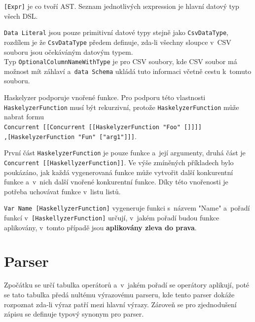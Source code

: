 \documentclass[male, czech]{kithesis}
\newcommand{\haskellInline}[1]{\colorbox{gray!10}{\texttt{#1}}}
\begin{document}
\haskellInline{[Expr]} je co tvoří AST.
Seznam jednotlivých \i{expression} je hlavní datový typ všech DSL. 

\haskellInline{Data Literal} jsou pouze primitivní datové typy stejně jako
\haskellInline{CsvDataType}, 
rozdílem je že \haskellInline{CsvDataType} předem definuje, 
zda-li všechny sloupce v~CSV souboru jsou očekáváným datovým typem. \\
Typ \haskellInline{OptionalColumnNameWithType} je pro CSV soubory, 
kde CSV soubor má možnost
mít záhlaví a~\haskellInline{data Schema} ukládá tuto informaci včetně cestu k~tomuto souboru. 

Haskelyzer podporuje vnořené funkce. 
Pro podporu této vlastnosti \haskellInline{HaskelyzerFunction} musí být rekurzivní, 
protože \haskellInline{HaskelyzerFunction} může nabrat formu 
\\
\haskellInline{Concurrent [[Concurrent [[HaskelyzerFunction "Foo" []]]]}
\\
\haskellInline{,[HaskelyzerFunction "Fun" ["arg1"]]]}.

První část \haskellInline{HaskelyzerFunction} je pouze funkce
a~její argumenty, 
druhá část je \\
\haskellInline{Concurrent [[HaskellyzerFunction]]}.
Ve výše zmíněných příkladech bylo poukázáno, 
jak každá vygenerovaná funkce může vytvořit 
další konkurentní funkce a~v~nich další vnořené konkurentní funkce. 
Díky této vnořenosti 
je potřeba uchovávat funkce v~listu listů.

\haskellInline{Var Name [HaskellyzerFunction]} vygeneruje funkci s~názvem "Name"
a~pořadí funkcí v~\haskellInline{[HaskellyzerFunction]} určují, 
v~jakém pořadí budou funkce aplikovány,
v~tomto případě jsou \textbf{aplikovány zleva do prava}.

\section{Parser}

Zpočátku se určí tabulka operátorů
a~v~jakém pořadí se operátory aplikují, 
poté se tato tabulka předá nultému výrazovému parseru, 
kde tento parser dokáže rozpoznat zda-li výraz patří mezi
hlavní výrazy. 
Zároveň se pro zjednodušení zápisu se definuje typový 
synonym pro parser.
\end{document}

